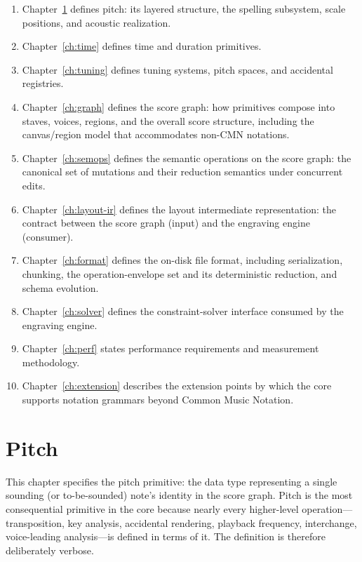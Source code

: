 \documentclass[11pt,letterpaper]{report}
\newcounter{requirement}[chapter]
\begin{document}
\begin{enumerate}
  \item Chapter~\ref{ch:pitch} defines pitch: its layered structure, the
    spelling subsystem, scale positions, and acoustic realization.
  \item Chapter~\ref{ch:time} defines time and duration primitives.
  \item Chapter~\ref{ch:tuning} defines tuning systems, pitch spaces, and
    accidental registries.
  \item Chapter~\ref{ch:graph} defines the score graph: how primitives
    compose into staves, voices, regions, and the overall score
    structure, including the canvas/region model that accommodates
    non-CMN notations.
  \item Chapter~\ref{ch:semops} defines the semantic operations on the
    score graph: the canonical set of mutations and their reduction
    semantics under concurrent edits.
  \item Chapter~\ref{ch:layout-ir} defines the layout intermediate
    representation: the contract between the score graph (input) and the
    engraving engine (consumer).
  \item Chapter~\ref{ch:format} defines the on-disk file format, including
    serialization, chunking, the operation-envelope set and its
    deterministic reduction, and schema evolution.
  \item Chapter~\ref{ch:solver} defines the constraint-solver interface
    consumed by the engraving engine.
  \item Chapter~\ref{ch:perf} states performance requirements and
    measurement methodology.
  \item Chapter~\ref{ch:extension} describes the extension points by
    which the core supports notation grammars beyond Common Music
    Notation.
\end{enumerate}

\chapter{Pitch}
\label{ch:pitch}

This chapter specifies the pitch primitive: the data type representing
a single sounding (or to-be-sounded) note's identity in the score graph.
Pitch is the most consequential primitive in the core because nearly every
higher-level operation---transposition, key analysis, accidental rendering,
playback frequency, interchange, voice-leading analysis---is defined in
terms of it. The definition is therefore deliberately verbose.
\end{document}
